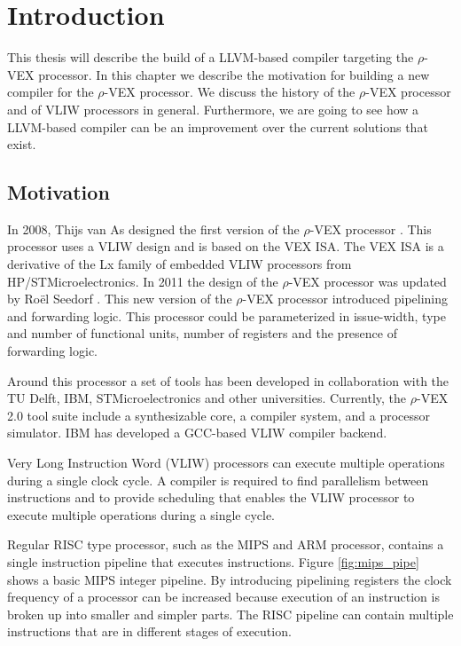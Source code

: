 \chapter{Introduction}
\label{chap:introduction}
This thesis will describe the build of a LLVM-based compiler targeting the $\rho$-VEX processor. In this chapter we describe the motivation for building a new compiler for the $\rho$-VEX processor. We discuss the history of the $\rho$-VEX processor and of VLIW processors in general. Furthermore, we are going to see how a LLVM-based compiler can be an improvement over the current solutions that exist.

\section{Motivation}
In 2008, Thijs van As designed the first version of the $\rho$-VEX processor \cite{As:2008rt}. This processor uses a VLIW design and is based on the VEX ISA. The VEX ISA is a derivative of the Lx family of embedded VLIW processors \cite{854391} from HP/STMicroelectronics. In 2011 the design of the $\rho$-VEX  processor was updated by Ro\"{e}l Seedorf \cite{Roel-Seedorf:2012qf}. This new version of the $\rho$-VEX  processor introduced pipelining and forwarding logic. This processor could be parameterized in issue-width, type and number of functional units, number of registers and the presence of forwarding logic.

Around this processor a set of tools has been developed in collaboration with the TU Delft, IBM, STMicroelectronics and other universities. Currently, the $\rho$-VEX 2.0 tool suite include a synthesizable core, a compiler system, and a processor simulator. IBM has developed a GCC-based VLIW compiler backend.

Very Long Instruction Word (VLIW) \cite{Fisher:1983:VLI:1067651.801649} processors can execute multiple operations during a single clock cycle. A compiler is required to find parallelism between instructions and to provide scheduling that enables the VLIW processor to execute multiple operations during a single cycle.

Regular RISC type processor, such as the MIPS and ARM processor, contains a single instruction pipeline that executes instructions. Figure \ref{fig:mips_pipe} shows a basic MIPS integer pipeline. By introducing pipelining registers the clock frequency of a processor can be increased because execution of an instruction is broken up into smaller and simpler parts. The RISC pipeline can contain multiple instructions that are in different stages of execution.

